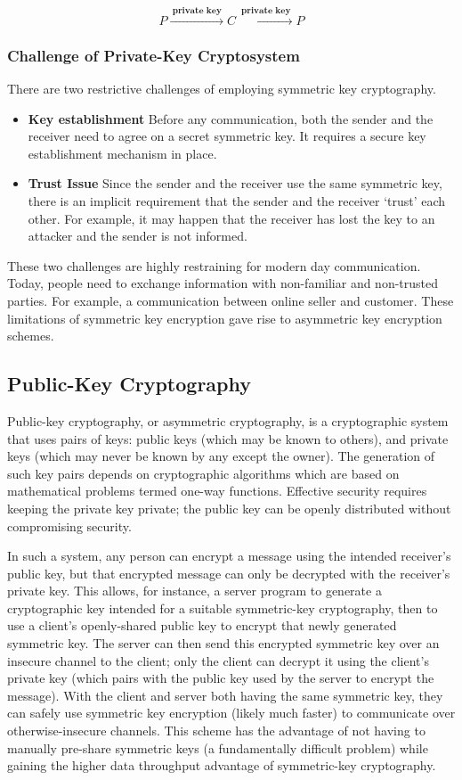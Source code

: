 \documentclass[british]{article}
\begin{document}
\[
P\xrightarrow{\:\textbf{private key}\:}C\xrightarrow{\:\textbf{private key}\:}P
\]

\medskip{}


\subsubsection{Challenge of Private-Key Cryptosystem}

There are two restrictive challenges of employing symmetric key cryptography. 
\begin{itemize}
\item \textbf{Key establishment \textminus{}} Before any communication,
both the sender and the receiver need to agree on a secret symmetric
key. It requires a secure key establishment mechanism in place. 
\item \textbf{Trust Issue \textminus{}} Since the sender and the receiver
use the same symmetric key, there is an implicit requirement that
the sender and the receiver `trust' each other. For example, it
may happen that the receiver has lost the key to an attacker and the
sender is not informed. 
\end{itemize}
These two challenges are highly restraining for modern day communication.
Today, people need to exchange information with non-familiar and non-trusted
parties. For example, a communication between online seller and customer.
These limitations of symmetric key encryption gave rise to asymmetric
key encryption schemes.

\subsection{Public-Key Cryptography}

Public-key cryptography, or asymmetric cryptography, is a cryptographic
system that uses pairs of keys: public keys (which may be known to
others), and private keys (which may never be known by any except
the owner). The generation of such key pairs depends on cryptographic
algorithms which are based on mathematical problems termed one-way
functions. Effective security requires keeping the private key private;
the public key can be openly distributed without compromising security.

In such a system, any person can encrypt a message using the intended
receiver's public key, but that encrypted message can only be decrypted
with the receiver's private key. This allows, for instance, a server
program to generate a cryptographic key intended for a suitable symmetric-key
cryptography, then to use a client's openly-shared public key to encrypt
that newly generated symmetric key. The server can then send this
encrypted symmetric key over an insecure channel to the client; only
the client can decrypt it using the client's private key (which pairs
with the public key used by the server to encrypt the message). With
the client and server both having the same symmetric key, they can
safely use symmetric key encryption (likely much faster) to communicate
over otherwise-insecure channels. This scheme has the advantage of
not having to manually pre-share symmetric keys (a fundamentally difficult
problem) while gaining the higher data throughput advantage of symmetric-key
cryptography.
\end{document}
